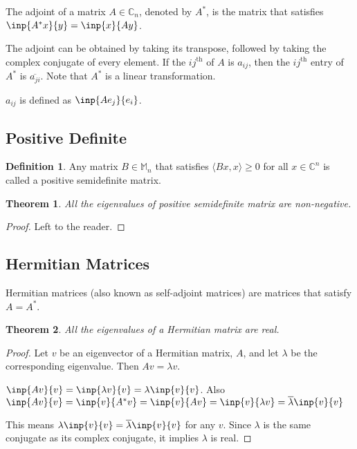 \documentclass[twofold]{article}
\newcommand*\conj[1]{\overline{#1}}
\newcommand*\adj[1]{#1^*}
\theoremstyle{plain}
\newtheorem*{theorem}{Theorem}
\theoremstyle{definition}
\newtheorem*{definition}{Definition}
\begin{document}
The adjoint of a matrix \(A \in \mathbb{C}_n\), denoted by \(\adj{A}\), is the matrix that  satisfies \(\inp{\adj{A}x}{y} = \inp{x}{Ay}\). 

The adjoint can be obtained by taking its transpose, followed by taking the complex conjugate of every element. If the \(ij^{\text{th}} \) of \(A\) is \(a_{ij}\), then the \(ij^{\text{th}}\) entry of \(\adj{A}\) is \(\conj{a_{ji}}\). Note that \(\adj{A}\) is a linear transformation.

\(a_{ij}\) is defined as \(\inp{Ae_j}{e_i}\).

\subsection{Positive Definite}

\begin{definition} Any matrix \(B \in \mathbb{M}_n\) that satisfies \(\langle Bx, x\rangle \ge 0\) for all \(x \in \mathbb{C}^n\) is called a positive semidefinite matrix. \end{definition}

\begin{theorem}All the eigenvalues of positive semidefinite matrix are non-negative. \end{theorem}
\begin{proof} Left to the reader. \end{proof}


\subsection{Hermitian Matrices}
Hermitian matrices (also known as self-adjoint matrices) are matrices that satisfy \(A = \adj{A}\). 

\begin{theorem} All the eigenvalues of a Hermitian matrix are real. \end{theorem}

\begin{proof}
Let \(v\) be an eigenvector of a Hermitian matrix, \(A\), and let \(\lambda\) be the corresponding eigenvalue. Then \(Av = \lambda v\). 

\(\inp{Av}{v} = \inp{\lambda v}{v} = \lambda\inp{v}{v}\). Also \(\inp{Av}{v} = \inp{v}{\adj{A}v} = \inp{v}{Av} = \inp{v}{\lambda v} = \conj{\lambda} \inp{v}{v}\)

This means \(\lambda \inp{v}{v} = \conj{\lambda} \inp{v}{v}\) for any \(v\). Since \(\lambda\) is the same conjugate as its complex conjugate, it implies \(\lambda\) is real. 
 \end{proof}
\end{document}
